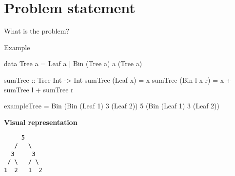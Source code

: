 \section{Problem statement}

\begin{slide}{What is the problem?}


\end{slide}

\begin{slide}{Example}
\begin{haskell}
data Tree a = Leaf a | Bin (Tree a) a (Tree a)

sumTree :: Tree Int -> Int
sumTree (Leaf x)    = x
sumTree (Bin l x r) = x + sumTree l + sumTree r

exampleTree = Bin (Bin (Leaf 1) 3 (Leaf 2)) 5 (Bin (Leaf 1) 3 (Leaf 2))
\end{haskell}

\begin{center}
\textbf{Visual representation}

\begin{verbatim}
     5 
   /   \
  3     3
 / \   / \
1  2   1  2
\end{verbatim}
\end{center}
\end{slide}

